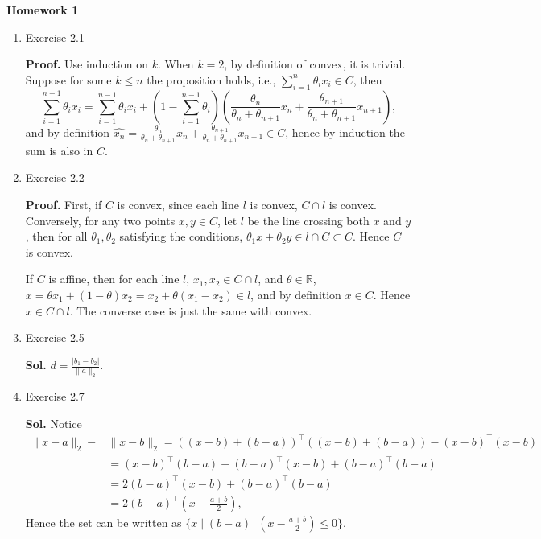 \documentclass{article}%
\begin{document}
\begin{center}
\textbf{Homework 1}\bigskip
\end{center}
\begin{enumerate}
\item Exercise 2.1 

\textbf{Proof.} Use induction on $k$. When $ k = 2$, by definition of convex, it is trivial. Suppose for some $k \le n$ the proposition holds, i.e., 
$\sum_{i=1}^{n} \theta_{i}x_i\in C $, then 
$$
\sum_{i=1}^{n+1}\theta_{i}x_i = \sum_{i=1}^{n-1}\theta_ix_i + (1-\sum_{i=1}^{n-1}\theta_i)\left(\frac{\theta_n}{\theta_{n}+\theta_{n+1}}x_n + \frac{\theta_{n+1}}{\theta_{n}+\theta_{n+1}}x_{n+1}\right),
$$
and by definition $\hat{x_n} = \frac{\theta_n}{\theta_{n}+\theta_{n+1}}x_n + \frac{\theta_{n+1}}{\theta_{n}+\theta_{n+1}}x_{n+1} \in C$, hence by induction the sum is also in $C$.

\item Exercise 2.2

\textbf{Proof.} First, if $C$ is convex, since each line $l$ is convex, $C\cap l$ is convex. Conversely, for any two points $x, y\in C$, let $l$ be the line crossing both $x$ and $y$, then for all $\theta_1, \theta_2 $ satisfying the conditions, $\theta_1x+\theta_2y\in l\cap C\subset C $. Hence $C$ is convex.

If $C$ is affine, then for each line $l$, $x_1, x_2\in C\cap l $, and $\theta\in \mathbb{R}$, $x = \theta x_1 + (1-\theta)x_2 = x_2 + \theta(x_1 - x_2) \in l$, and by definition $x\in C$. Hence $x \in C\cap l$. The converse case is just the same with convex.

\item Exercise 2.5

\textbf{Sol. } $d = \frac{|b_1-b_2|}{\lVert a\rVert_2}$.

\item Exercise 2.7

\newcommand{\lv}{\lVert}
\newcommand{\rv}{\rVert}
\textbf{Sol.} Notice 
$$
\begin{aligned}
\lv x-a \rv_2 - &\lv x-b \rv_2 = ((x-b) + (b-a))^\top((x-b) + (b-a)) - (x-b)^\top (x-b)\\
&= (x-b)^\top(b-a)+(b-a)^\top(x-b)+(b-a)^\top(b-a) \\
&= 2(b-a)^\top(x-b)+(b-a)^\top(b-a)\\
&= 2(b-a)^\top (x-\frac{a+b}{2}),
\end{aligned}
$$
Hence the set can be written as $\{x\mid(b-a)^\top (x-\frac{a+b}{2}) \le 0\}$.


\end{enumerate}
\end{document}
